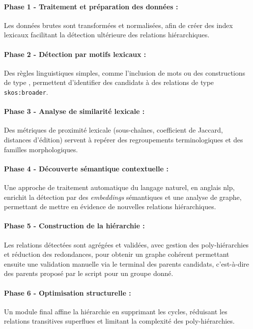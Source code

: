 \paragraph{Phase 1 - Traitement et préparation des données :}
Les données brutes sont transformées et normalisées, afin de créer des index lexicaux facilitant la détection ultérieure des relations hiérarchiques.

\paragraph{Phase 2 - Détection par motifs lexicaux :}  
Des règles linguistiques simples, comme l’inclusion de mots ou des constructions de type , permettent d’identifier des candidats à des relations de type \texttt{skos:broader}.

\paragraph{Phase 3 - Analyse de similarité lexicale :}  
Des métriques de proximité lexicale (sous-chaînes, coefficient de Jaccard, distances d’édition) servent à repérer des regroupements terminologiques et des familles morphologiques.

\paragraph{Phase 4 - Découverte sémantique contextuelle :}  
Une approche de traitement automatique du langage naturel, en anglais \gls{nlp}, enrichit la détection par des \textit{embeddings} sémantiques et une analyse de graphe, permettant de mettre en évidence de nouvelles relations hiérarchiques.

\paragraph{Phase 5 - Construction de la hiérarchie :}  
Les relations détectées sont agrégées et validées, avec gestion des poly-hiérarchies et réduction des redondances, pour obtenir un graphe cohérent permettant ensuite une validation manuelle via le terminal des parents candidats, c'est-à-dire des parents proposé par le script pour un groupe donné.

\paragraph{Phase 6 - Optimisation structurelle :}  
Un module final affine la hiérarchie en supprimant les cycles, réduisant les relations transitives superflues et limitant la complexité des poly-hiérarchies.

